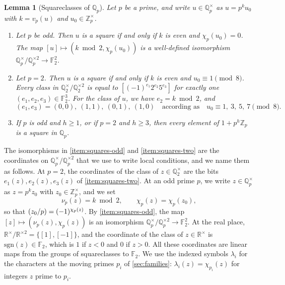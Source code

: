 \documentclass[12pt,oneside,openany]{book}
\theoremstyle{definition}
\theoremstyle{plain}
\numberwithin{equation}{chapter}
\theoremstyle{plain}
\newtheorem{lemma}[lemma]{Lemma}
\theoremstyle{definition}
\theoremstyle{remark}
\newcommand{\Q}{\mathbb Q}
\newcommand{\Z}{\mathbb Z}
\newcommand{\F}{\mathbb F}
\newcommand{\R}{\mathbb R}
\newcommand{\leg}[2]{\mathchoice{\left(\frac{#1}{#2}\right)}{(#1/#2)}{(#1/#2)}{(#1/#2)}}
\newcommand{\sq}[1]{[#1]}
\newcommand{\sqgp}[1]{#1^{\times}/#1^{\times2}}
\begin{document}
\begin{lemma}[Squareclasses of $\Q_p$]\label{lem:squares}
Let $p$ be a prime, and write $u\in\Q_p^\times$ as $u=p^ku_0$ with $k=v_p(u)$ and $u_0\in\Z_p^\times$.
\begin{enumerate}[label=(\alph*),ref=(\alph*)]
\item\label{item:squares-odd} Let $p$ be odd. Then $u$ is a square if and only if $k$ is even and $\chi_p(u_0)=0$. The map $\sq u\mapsto(k\bmod2,\chi_p(u_0))$ is a well-defined isomorphism $\sqgp{\Q_p}\to\F_2^2$.
\item\label{item:squares-two} Let $p=2$. Then $u$ is a square if and only if $k$ is even and $u_0\equiv1\pmod8$. Every class in $\sqgp{\Q_2}$ is equal to $\sq{(-1)^{e_1}2^{e_2}5^{e_3}}$ for exactly one $(e_1,e_2,e_3)\in\F_2^3$. For the class of $u$, we have $e_2=k\bmod2$, and
\begin{equation}\label{eq:two-adic-coordinates}
(e_1,e_3)=(0,0),\ (1,1),\ (0,1),\ (1,0)\quad\text{according as}\quad u_0\equiv1,\ 3,\ 5,\ 7\pmod8.
\end{equation}
\item\label{item:squares-one} If $p$ is odd and $h\ge1$, or if $p=2$ and $h\ge3$, then every element of $1+p^h\Z_p$ is a square in $\Q_p$.
\end{enumerate}
\end{lemma}

The isomorphisms in \ref{item:squares-odd} and \ref{item:squares-two} are the coordinates on $\sqgp{\Q_p}$ that we use to write local conditions, and we name them as follows. At $p=2$, the coordinates of the class of $z\in\Q_2^\times$ are the bits $e_1(z),e_2(z),e_3(z)$ of \ref{item:squares-two}. At an odd prime $p$, we write $z\in\Q_p^\times$ as $z=p^kz_0$ with $z_0\in\Z_p^\times$, and we set
\begin{equation}\label{eq:odd-coordinates}
\nu_p(z)=k\bmod2,\qquad\chi_p(z)=\chi_p(z_0),
\end{equation}
so that $\leg{z_0}p=(-1)^{\chi_p(z)}$. By \ref{item:squares-odd}, the map $\sq z\mapsto(\nu_p(z),\chi_p(z))$ is an isomorphism $\sqgp{\Q_p}\to\F_2^2$. At the real place, $\sqgp\R=\{\sq1,\sq{-1}\}$, and the coordinate of the class of $z\in\R^\times$ is $\mathrm{sgn}(z)\in\F_2$, which is $1$ if $z<0$ and $0$ if $z>0$. All these coordinates are linear maps from the groups of squareclasses to $\F_2$. We use the indexed symbols $\lambda_i$ for the characters at the moving primes $p_i$ of \cref{sec:families}: $\lambda_i(z)=\chi_{p_i}(z)$ for integers $z$ prime to $p_i$.
\end{document}
